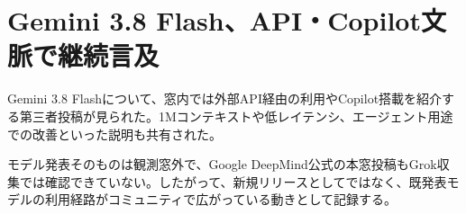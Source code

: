 \section{Gemini 3.8 Flash、API・Copilot文脈で継続言及}
Gemini 3.8 Flashについて、窓内では外部API経由の利用やCopilot搭載を紹介する第三者投稿が見られた。1Mコンテキストや低レイテンシ、エージェント用途での改善といった説明も共有された。

モデル発表そのものは観測窓外で、Google DeepMind公式の本窓投稿もGrok収集では確認できていない。したがって、新規リリースとしてではなく、既発表モデルの利用経路がコミュニティで広がっている動きとして記録する。
